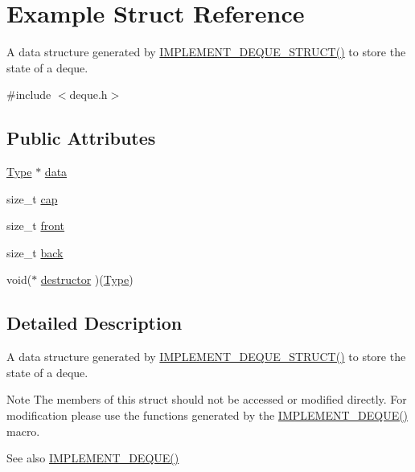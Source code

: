 \hypertarget{structExample}{}\section{Example Struct Reference}
\label{structExample}


A data structure generated by \hyperlink{deque_8h_a091cfc1289538b13036bcd36d12a3c01}{I\+M\+P\+L\+E\+M\+E\+N\+T\+\_\+\+D\+E\+Q\+U\+E\+\_\+\+S\+T\+R\+U\+C\+T()} to store the state of a deque.  




{\ttfamily \#include $<$deque.\+h$>$}

\subsection*{Public Attributes}
\begin{DoxyCompactItemize}
\item 
\hyperlink{deque_8h_ac9c83c2070eb6b5891cf742b90f54c68}{Type} $\ast$ \hyperlink{structExample_aff9c97770bf4afc778ac2fc0c693d3b0}{data}
\item 
size\+\_\+t \hyperlink{structExample_a42fd483a97081133af34019cfb99c875}{cap}
\item 
size\+\_\+t \hyperlink{structExample_ad28f26e5c53b98255d98b65e82fae766}{front}
\item 
size\+\_\+t \hyperlink{structExample_ab52696b8c662a542dccff1fabda7de00}{back}
\item 
void($\ast$ \hyperlink{structExample_ae42fbec90128c56bc0c81d06cc17acd3}{destructor} )(\hyperlink{deque_8h_ac9c83c2070eb6b5891cf742b90f54c68}{Type})
\end{DoxyCompactItemize}


\subsection{Detailed Description}
A data structure generated by \hyperlink{deque_8h_a091cfc1289538b13036bcd36d12a3c01}{I\+M\+P\+L\+E\+M\+E\+N\+T\+\_\+\+D\+E\+Q\+U\+E\+\_\+\+S\+T\+R\+U\+C\+T()} to store the state of a deque. 

\begin{DoxyNote}{Note}
The members of this struct should not be accessed or modified directly. For modification please use the functions generated by the \hyperlink{deque_8h_a71fbe309fa88eb8d294b141f33d81233}{I\+M\+P\+L\+E\+M\+E\+N\+T\+\_\+\+D\+E\+Q\+U\+E()} macro.
\end{DoxyNote}
\begin{DoxySeeAlso}{See also}
\hyperlink{deque_8h_a71fbe309fa88eb8d294b141f33d81233}{I\+M\+P\+L\+E\+M\+E\+N\+T\+\_\+\+D\+E\+Q\+U\+E()} 
\end{DoxySeeAlso}


